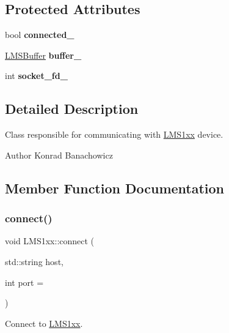 \subsection*{Protected Attributes}
\begin{DoxyCompactItemize}
\item 
\mbox{\label{classLMS1xx_ada186ec65d6cbe26d5499cb06457029d}} 
bool {\bfseries connected\+\_\+}
\item 
\mbox{\label{classLMS1xx_a2b25bb24cb41ce11f0e2b0a3b772cb96}} 
\hyperlink{classLMSBuffer}{L\+M\+S\+Buffer} {\bfseries buffer\+\_\+}
\item 
\mbox{\label{classLMS1xx_a97c421968056f2dc4b88dab33cffe426}} 
int {\bfseries socket\+\_\+fd\+\_\+}
\end{DoxyCompactItemize}


\subsection{Detailed Description}
Class responsible for communicating with \hyperlink{classLMS1xx}{L\+M\+S1xx} device. 

\begin{DoxyAuthor}{Author}
Konrad Banachowicz 
\end{DoxyAuthor}


\subsection{Member Function Documentation}
\mbox{\label{classLMS1xx_ae907a9e0c30a7cb34bdcbf44589ba9cc}} 
\subsubsection{\texorpdfstring{connect()}{connect()}}
{\footnotesize\ttfamily void L\+M\+S1xx\+::connect (\begin{DoxyParamCaption}\item[{std\+::string}]{host,  }\item[{int}]{port = {} }\end{DoxyParamCaption})}



Connect to \hyperlink{classLMS1xx}{L\+M\+S1xx}. 


